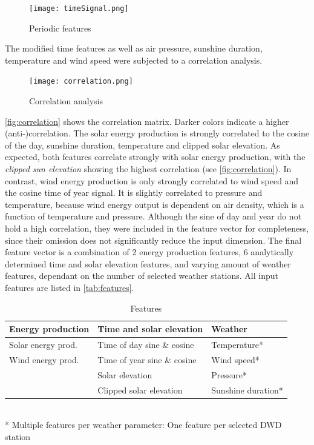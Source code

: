 \documentclass[11pt,table]{article}
\begin{document}
\begin{figure}[!htb]
	\centering
	\texttt{[image: timeSignal.png]}
	\caption{Periodic features}
	\label{fig:timeSignal}
\end{figure}

The modified time features as well as air pressure, sunshine duration, temperature and wind speed were subjected to a correlation analysis. 
\begin{figure}[p]
	\centering
	\texttt{[image: correlation.png]}
	\caption{Correlation analysis}
	\label{fig:correlation}
\end{figure}
\autoref{fig:correlation} shows the correlation matrix. Darker colors indicate a higher (anti-)correlation. The solar energy production is strongly correlated to the cosine of the day, sunshine duration, temperature and clipped solar elevation. As expected, both features correlate strongly with solar energy production, with the \textit{clipped sun elevation} showing the highest correlation (see \autoref{fig:correlation}). In contrast, wind energy production is only strongly correlated to wind speed and the cosine time of year signal. It is slightly correlated to pressure and temperature, because wind energy output is dependent on air density, which is a function of temperature and pressure. Although the sine of day and year do not hold a high correlation, they were included in the feature vector for completeness, since their omission does not significantly reduce the input dimension.
The final feature vector is a combination of 2 energy production features, 6 analytically determined time and solar elevation features, and varying amount of weather features, dependant on the number of selected weather stations. All input features are listed in \autoref{tab:features}.

\begin{table}[p]
    \centering
    \caption{Features}
    \begin{tabular}{lll}
        \toprule
        \textbf{Energy production} & \textbf{Time and solar elevation} & \textbf{Weather} \\ \midrule
        Solar energy prod. & Time of day sine \& cosine     & Temperature*       \\
        Wind energy prod.  & Time of year sine \& cosine    & Wind speed*        \\
                           & Solar elevation                & Pressure*          \\
                           & Clipped solar elevation        & Sunshine duration* \\ \bottomrule
    \end{tabular}
    \\[0.1cm]
    \footnotesize{* Multiple features per weather parameter: One feature per selected \ac{DWD} station}
    \label{tab:features}
\end{table}
\end{document}
